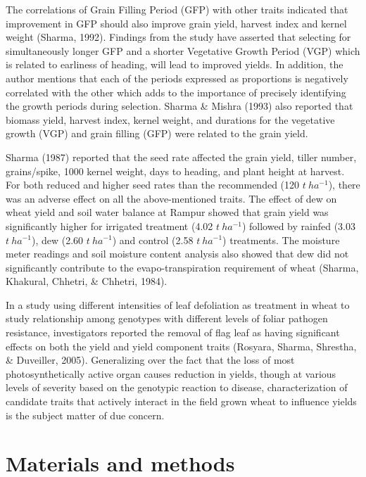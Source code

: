 \documentclass[12pt,oneside]{dukestatscithesis} %
\begin{document}
The correlations of Grain Filling Period (GFP) with other traits indicated that improvement in GFP should also improve grain yield, harvest index and kernel weight (Sharma, 1992). Findings from the study have asserted that selecting for simultaneously longer GFP and a shorter Vegetative Growth Period (VGP) which is related to earliness of heading, will lead to improved yields. In addition, the author mentions that each of the periods expressed as proportions is negatively correlated with the other which adds to the importance of precisely identifying the growth periods during selection. Sharma \& Mishra (1993) also reported that biomass yield, harvest index, kernel weight, and durations for the vegetative growth (VGP) and grain filling (GFP) were related to the grain yield.

Sharma (1987) reported that the seed rate affected the grain yield, tiller number, grains/spike, 1000 kernel weight, days to heading, and plant height at harvest. For both reduced and higher seed rates than the recommended (120 \(t\ ha^{-1}\)), there was an adverse effect on all the above-mentioned traits. The effect of dew on wheat yield and soil water balance at Rampur showed that grain yield was significantly higher for irrigated treatment (4.02 \(t\ ha^{-1}\)) followed by rainfed (3.03 \(t\ ha^{-1}\)), dew (2.60 \(t\ ha^{-1}\)) and control (2.58 \(t\ ha^{-1}\)) treatments. The moisture meter readings and soil moisture content analysis also showed that dew did not significantly contribute to the evapo-transpiration requirement of wheat (Sharma, Khakural, Chhetri, \& Chhetri, 1984).

In a study using different intensities of leaf defoliation as treatment in wheat to study relationship among genotypes with different levels of foliar pathogen resistance, investigators reported the removal of flag leaf as having significant effects on both the yield and yield component traits (Rosyara, Sharma, Shrestha, \& Duveiller, 2005). Generalizing over the fact that the loss of most photosynthetically active organ causes reduction in yields, though at various levels of severity based on the genotypic reaction to disease, characterization of candidate traits that actively interact in the field grown wheat to influence yields is the subject matter of due concern.

\hypertarget{mat-met}{%
\chapter{Materials and methods}\label{mat-met}}
\end{document}
